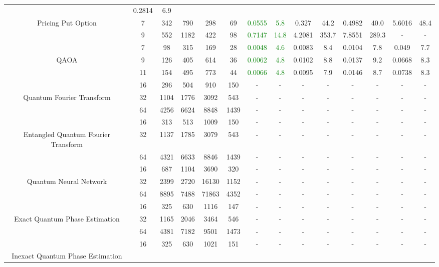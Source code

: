 \begin{table}[htb]
{\begin{tabular}{|c|c|c|c|c|c|c|c|c|c|c|c|c|c|}
 & 0.2814 & 6.9
 \\
Pricing Put Option & 
7 & 342 & 790 & 298 & 69
 & \textcolor{green}{0.0555} & \textcolor{green}{5.8}
 & 0.327 & 44.2
 & 0.4982 & 40.0
 & 5.6016 & 48.4
 \\
 & 
9 & 552 & 1182 & 422 & 98
 & \textcolor{green}{0.7147} & \textcolor{green}{14.8}
 & 4.2081 & 353.7
 & 7.8551 & 289.3
 & - & -
 \\
\hline
 & 
7 & 98 & 315 & 169 & 28
 & \textcolor{green}{0.0048} & \textcolor{green}{4.6}
 & 0.0083 & 8.4
 & 0.0104 & 7.8
 & 0.049 & 7.7
 \\
QAOA & 
9 & 126 & 405 & 614 & 36
 & \textcolor{green}{0.0062} & \textcolor{green}{4.8}
 & 0.0102 & 8.8
 & 0.0137 & 9.2
 & 0.0668 & 8.3
 \\
 & 
11 & 154 & 495 & 773 & 44
 & \textcolor{green}{0.0066} & \textcolor{green}{4.8}
 & 0.0095 & 7.9
 & 0.0146 & 8.7
 & 0.0738 & 8.3
 \\
\hline
 & 
16 & 296 & 504 & 910 & 150
 & - & -
 & - & -
 & - & -
 & - & -
 \\
Quantum Fourier Transform & 
32 & 1104 & 1776 & 3092 & 543
 & - & -
 & - & -
 & - & -
 & - & -
 \\
 & 
64 & 4256 & 6624 & 8848 & 1439
 & - & -
 & - & -
 & - & -
 & - & -
 \\
\hline
 & 
16 & 313 & 513 & 1009 & 150
 & - & -
 & - & -
 & - & -
 & - & -
 \\
Entangled Quantum Fourier Transform & 
32 & 1137 & 1785 & 3079 & 543
 & - & -
 & - & -
 & - & -
 & - & -
 \\
 & 
64 & 4321 & 6633 & 8846 & 1439
 & - & -
 & - & -
 & - & -
 & - & -
 \\
\hline
 & 
16 & 687 & 1104 & 3690 & 320
 & - & -
 & - & -
 & - & -
 & - & -
 \\
Quantum Neural Network & 
32 & 2399 & 2720 & 16130 & 1152
 & - & -
 & - & -
 & - & -
 & - & -
 \\
 & 
64 & 8895 & 7488 & 71863 & 4352
 & - & -
 & - & -
 & - & -
 & - & -
 \\
\hline
 & 
16 & 325 & 630 & 1116 & 147
 & - & -
 & - & -
 & - & -
 & - & -
 \\
Exact Quantum Phase Estimation & 
32 & 1165 & 2046 & 3464 & 546
 & - & -
 & - & -
 & - & -
 & - & -
 \\
 & 
64 & 4381 & 7182 & 9501 & 1473
 & - & -
 & - & -
 & - & -
 & - & -
 \\
\hline
 & 
16 & 325 & 630 & 1021 & 151
 & - & -
 & - & -
 & - & -
 & - & -
 \\
Inexact Quantum Phase Estimation & 

\end{tabular}}
\end{table}
